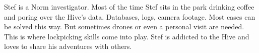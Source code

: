 \begin{npcBox}[title=Stef - a Norm investigator]
    \begin{stressSection}
    \end{stressSection}
    \begin{tabularx}{\textwidth}{ XX }
    \end{tabularx}

    \begin{consequences}
    \item {}
    \item {}
    \item {}
    \end{consequences}

    \begin{npcDescription}
    Stef is a Norm investigator. Most of the time Stef sits in the park drinking coffee and poring over the Hive's data. Databases, logs, camera footage. Most cases can be solved this way. But sometimes drones or even a personal visit are needed. This is where lockpicking skills come into play.
    Stef is addicted to the Hive and loves to share his adventures with others.
    \end{npcDescription}

\end{npcBox}

\newpage

